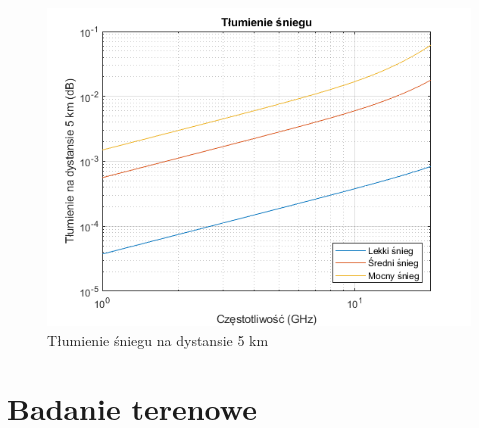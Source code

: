 \begin{figure}[h!]
	\label{fig4}
	\includegraphics{./grafika/num_sim4_tlumienie_podczas_opadu_sniegu_5km.png}
	\caption{Tłumienie śniegu na dystansie 5 km}
\end{figure}


\section{Badanie terenowe}